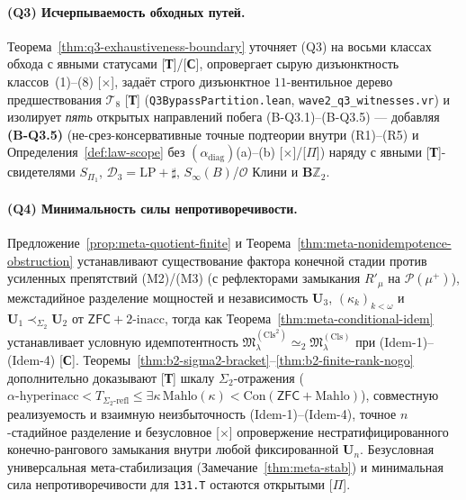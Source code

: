 \documentclass[11pt]{article}
\theoremstyle{plain}
\theoremstyle{definition}
\newcommand{\fM}{\mathfrak{M}}
\newcommand{\Con}{\mathrm{Con}}
\newcommand{\ZFC}{\mathsf{ZFC}}
\begin{document}
\paragraph{(Q3) Исчерпываемость обходных путей.} Теорема~\ref{thm:q3-exhaustiveness-boundary} уточняет (Q3) на восьми классах обхода с явными статусами \textup{[\textbf{Т}]}/\textup{[\textbf{С}]}, опровергает сырую дизъюнктность классов~(1)--(8) \textup{[\textbf{$\times$}]}, задаёт строго дизъюнктное $11$-вентильное дерево предшествования $\mathcal{T}_8$ \textup{[\textbf{Т}]} (\texttt{Q3BypassPartition.lean}, \texttt{wave2\_q3\_witnesses.vr}) и изолирует \emph{пять} открытых направлений побега \textup{(B-Q3.1)--(B-Q3.5)} --- добавляя \textbf{(B-Q3.5)} (не-срез-консервативные точные подтеории внутри (R1)--(R5) и Определения~\ref{def:law-scope} без $(\alpha_{\mathrm{diag}})$(a)--(b) \textup{[\textbf{$\times$}]/[\textbf{$\Pi$}]}) наряду с явными \textup{[\textbf{Т}]}-свидетелями $S_{\Pi_1}$, $\mathcal{D}_3 = \mathrm{LP} + \sharp$, $S_\infty(B)$/$\mathcal{O}$ Клини и $\mathbf{B}\mathbb{Z}_2$.

\paragraph{(Q4) Минимальность силы непротиворечивости.} Предложение~\ref{prop:meta-quotient-finite} и Теорема~\ref{thm:meta-nonidempotence-obstruction} устанавливают существование фактора конечной стадии против усиленных препятствий (M2)/(M3) (с рефлекторами замыкания $R'_\mu$ на $\mathcal{P}(\mu^+)$), межстадийное разделение мощностей и независимость $\mathbf{U}_3$, $(\kappa_k)_{k<\omega}$ и $\mathbf{U}_1 \prec_{\Sigma_2} \mathbf{U}_2$ от $\ZFC + 2\text{-inacc}$, тогда как Теорема~\ref{thm:meta-conditional-idem} устанавливает условную идемпотентность $\fM^{(\mathrm{Cls}^2)}_\lambda \simeq_2 \fM^{(\mathrm{Cls})}_\lambda$ при (Idem-1)--(Idem-4) \textup{[\textbf{С}]}. Теоремы~\ref{thm:b2-sigma2-bracket}--\ref{thm:b2-finite-rank-nogo} дополнительно доказывают \textup{[\textbf{Т}]} шкалу $\Sigma_2$-отражения ($\alpha\text{-hyperinacc} < T_{\Sigma_2\text{-refl}} \le \exists\kappa\,\mathrm{Mahlo}(\kappa) < \Con(\ZFC+\text{Mahlo})$), совместную реализуемость и взаимную неизбыточность (Idem-1)--(Idem-4), точное $n$-стадийное разделение и безусловное \textup{[\textbf{$\times$}]} опровержение нестратифицированного конечно-рангового замыкания внутри любой фиксированной $\mathbf{U}_n$. Безусловная универсальная мета-стабилизация (Замечание~\ref{thm:meta-stab}) и минимальная сила непротиворечивости для \texttt{131.T} остаются открытыми \textup{[\textbf{$\Pi$}]}.
\end{document}
